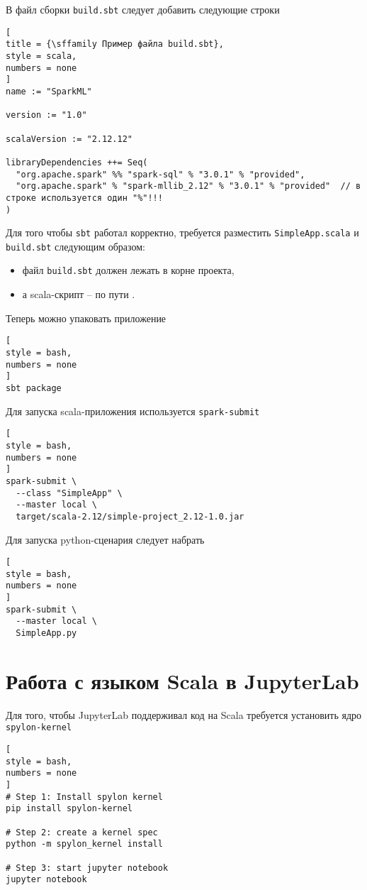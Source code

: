 \documentclass[%
	11pt,
	a4paper,
	utf8,
		]{article}
\begin{document}
В файл сборки \texttt{build.sbt} следует добавить следующие строки
\begin{lstlisting}[
title = {\sffamily Пример файла build.sbt},
style = scala,
numbers = none	
]
name := "SparkML"

version := "1.0"

scalaVersion := "2.12.12"

libraryDependencies ++= Seq(
  "org.apache.spark" %% "spark-sql" % "3.0.1" % "provided",
  "org.apache.spark" % "spark-mllib_2.12" % "3.0.1" % "provided"  // в строке используется один "%"!!!
)
\end{lstlisting}

Для того чтобы \texttt{sbt} работал корректно, требуется разместить \texttt{SimpleApp.scala} и \texttt{build.sbt} следующим образом:
\begin{itemize}
	\item файл \texttt{build.sbt} должен лежать в корне проекта,
	
	\item а scala-скрипт -- по пути .
\end{itemize}

Теперь можно упаковать приложение
\begin{lstlisting}[
style = bash,
numbers = none	
]
sbt package
\end{lstlisting}

Для запуска scala-приложения используется \texttt{spark-submit}
\begin{lstlisting}[
style = bash,
numbers = none	
]
spark-submit \
  --class "SimpleApp" \
  --master local \
  target/scala-2.12/simple-project_2.12-1.0.jar
\end{lstlisting}

Для запуска python-сценария следует набрать
\begin{lstlisting}[
style = bash,
numbers = none	
]
spark-submit \
  --master local \
  SimpleApp.py
\end{lstlisting}



\section{Работа с языком Scala в JupyterLab}

Для того, чтобы JupyterLab поддерживал код на Scala требуется установить ядро \texttt{spylon-kernel}
\begin{lstlisting}[
style = bash,
numbers = none	
]
# Step 1: Install spylon kernel
pip install spylon-kernel

# Step 2: create a kernel spec
python -m spylon_kernel install

# Step 3: start jupyter notebook 
jupyter notebook
\end{lstlisting}
\end{document}
